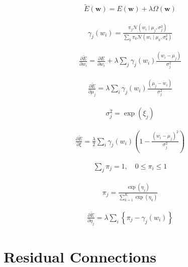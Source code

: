 \documentclass{article}
\begin{document}
\begin{align*}
\widetilde{E}(\mathbf{w})=E(\mathbf{w})+\lambda \Omega(\mathbf{w}) 
\tag{9.23}
\end{align*}

\begin{align*}
\gamma_{j}\left(w_{i}\right)=\frac{\pi_{j} \mathcal{N}\left(w_{i} \mid \mu_{j}, \sigma_{j}^{2}\right)}{\sum_{k} \pi_{k} \mathcal{N}\left(w_{i} \mid \mu_{k}, \sigma_{k}^{2}\right)} 
\tag{9.24}
\end{align*}

\begin{align*}
\frac{\partial \widetilde{E}}{\partial w_{i}}=\frac{\partial E}{\partial w_{i}}+\lambda \sum_{j} \gamma_{j}\left(w_{i}\right) \frac{\left(w_{i}-\mu_{j}\right)}{\sigma_{j}^{2}} 
\tag{9.25}
\end{align*}

\begin{align*}
\frac{\partial \widetilde{E}}{\partial \mu_{j}}=\lambda \sum_{i} \gamma_{j}\left(w_{i}\right) \frac{\left(\mu_{j}-w_{i}\right)}{\sigma_{j}^{2}} 
\tag{9.26}
\end{align*}

\begin{align*}
\sigma_{j}^{2}=\exp \left(\xi_{j}\right) 
\tag{9.27}
\end{align*}

\begin{align*}
\frac{\partial \widetilde{E}}{\partial \xi}=\frac{\lambda}{2} \sum_{i} \gamma_{j}\left(w_{i}\right)\left(1-\frac{\left(w_{i}-\mu_{j}\right)^{2}}{\sigma_{j}^{2}}\right) 
\tag{9.28}
\end{align*}

\begin{align*}
\sum_{j} \pi_{j}=1, \quad 0 \leqslant \pi_{i} \leqslant 1 
\tag{9.29}
\end{align*}

\begin{align*}
\pi_{j}=\frac{\exp \left(\eta_{j}\right)}{\sum_{k=1}^{K} \exp \left(\eta_{k}\right)} 
\tag{9.30}
\end{align*}

\begin{align*}
\frac{\partial \widetilde{E}}{\partial \eta_{j}}=\lambda \sum_{i}\left\{\pi_{j}-\gamma_{j}\left(w_{i}\right)\right\} 
\tag{9.31}
\end{align*}

\section{Residual Connections}
\end{document}
